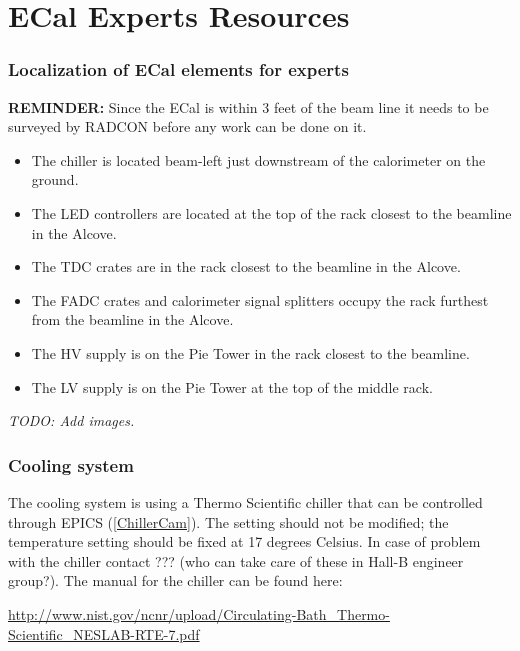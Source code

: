 \documentclass[12pt]{article}
\begin{document}
\newpage

\part{ECal Experts Resources}

   \section{Localization of ECal elements for experts}

{\bf REMINDER:} Since the ECal is within 3 feet of the beam line it needs to be surveyed by RADCON before any work can be done on it.
   {\footnotesize
\begin{itemize}
\item
The chiller is located beam-left just downstream of the calorimeter on the ground.
\item
The LED controllers are located at the top of the rack closest to the beamline in the Alcove.
\item
The TDC crates are in the rack closest to the beamline in the Alcove.
\item
The FADC crates and calorimeter signal splitters occupy the rack furthest from the beamline in the Alcove.
\item
The HV supply is on the Pie Tower in the rack closest to the beamline.
\item
The LV supply is on the Pie Tower at the top of the middle rack. 
\end{itemize}
{\it TODO: Add images.}
}

   \section{Cooling system}

   The cooling system is using a Thermo Scientific chiller that can be controlled through EPICS (\ref{ChillerCam}). The setting should not be modified; the temperature setting should be fixed at 17 degrees Celsius. In case of problem with the chiller contact ??? (who can take care of these in Hall-B engineer group?).  The manual for the chiller can be found here:

   {\noindent\footnotesize\url{http://www.nist.gov/ncnr/upload/Circulating-Bath\_Thermo-Scientific\_NESLAB-RTE-7.pdf}}
\end{document}
